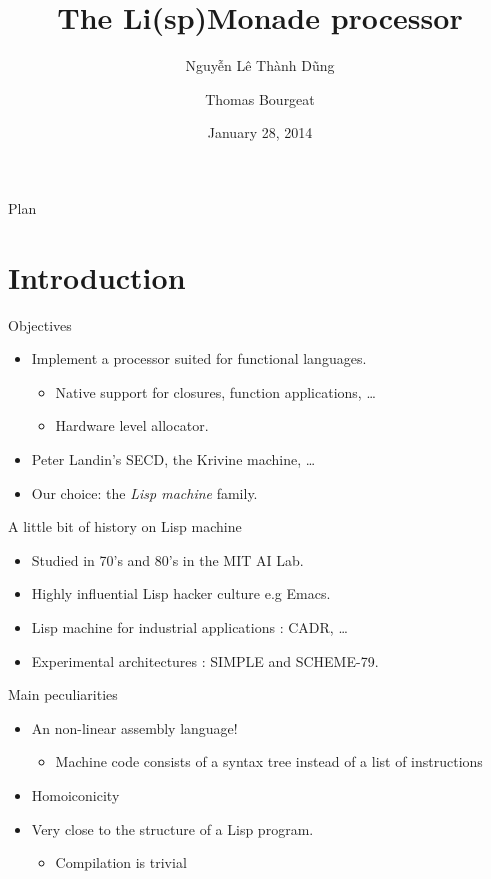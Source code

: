 \documentclass{beamer}
\title{The Li(sp)Monade processor}
\author[ENS Ulm]{Nguyễn Lê Thành Dũng \and Thomas Bourgeat}
\date{January 28, 2014}
\begin{document}
\begin{frame}
  \titlepage
\end{frame}

\begin{frame}{Plan}
  \tableofcontents
\end{frame}

\section{Introduction}

\begin{frame}{Objectives}
\begin{itemize}
\item Implement a processor suited for functional languages.
\begin{itemize}
\item Native support for closures, function applications, \dots
\item Hardware level allocator.
\end{itemize}
\item Peter Landin's SECD, the Krivine machine, \dots
\item Our choice: the \emph{Lisp machine} family.  
\end{itemize}
\end{frame}

\begin{frame}{A little bit of history on Lisp machine}
\begin{itemize}
\item Studied in 70's and 80's in the MIT AI Lab.
\item Highly influential Lisp hacker culture e.g Emacs.
\item Lisp machine for industrial applications : CADR, \dots
\item Experimental architectures : SIMPLE and SCHEME-79.
\end{itemize}
\end{frame}

\begin{frame}{Main peculiarities}
\begin{itemize}
\item An non-linear assembly language!
\begin{itemize}
\item Machine code consists of a syntax tree instead of a list of instructions
\end{itemize}
\item Homoiconicity
\item Very close to the structure of a Lisp program.
\begin{itemize}
\item Compilation is trivial
\end{itemize}
\end{itemize}
\end{frame}
\end{document}
